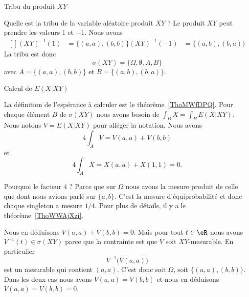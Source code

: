 \begin{subproof}
    \item[Tribu du produit \( XY\)]

        Quelle est la tribu de la variable aléatoire produit \( XY\) ? Le produit \( XY\) peut prendre les valeurs \( 1\) et \( -1\). Nous avons
        \begin{equation}
            \begin{aligned}[]
                (XY)^{-1}(1)&=\{ (a,a),(b,b) \}
                (XY)^{-1}(-1)&=\{ (a,b),(b,a) \}
            \end{aligned}
        \end{equation}
        La tribu est donc
        \begin{equation}
            \sigma(XY)=\{  \Omega,\emptyset, A,B  \}
        \end{equation}
        avec \( A=\{ (a,a),(b,b) \}\) et \( B=\{ (a,b),(b,a) \}\).

    \item[Calcul de \( E(X|XY)\)]

        La définition de l'espérance à calculer est le théorème~\ref{ThoMWfDPQ}. Pour chaque élément \( B\) de \( \sigma(XY)\) nous avons besoin de \( \int_BX=\int_B E(X|XY)\). Nous notons \( V=E(X|XY)\) pour alléger la notation. Nous avons
        \begin{equation}
            4\int_AV=V(a,a)+V(b,b)
        \end{equation}
        et
        \begin{equation}
            4\int_AX=X(a,a)+X(1,1)=0.
        \end{equation}

        Pourquoi le facteur \( 4\) ? Parce que sur \( \Omega\) nous avons la mesure produit de celle que dont nous avions parlé sur \( \{ a,b \}\). C'est la mesure d'équiprobabilité et donc chaque singleton a mesure \( 1/4\). Pour plus de détails, il y a le théorème~\ref{ThoWWAjXzi}.

        Nous en déduisons \( V(a,a)+V(b,b)=0\). Mais pour tout \( t\in \eR\) nous avons \( V^{-1}(t)\in \sigma(XY)\) parce que la contrainte est que \( V\) soit \( XY\)-mesurable. En particulier
        \begin{equation}
            V^{-1}\big( V(a,a) \big)
        \end{equation}
        est un mesurable qui contient \( (a,a)\). C'est donc soit \( \Omega\), soit \( \{ (a,a),(b,b) \}\). Dans les deux cas nous avons \( V(a,a)=V(b,b)\) et nous en déduisons \( V(a,a)=V(b,b)=0\).


\end{subproof}
